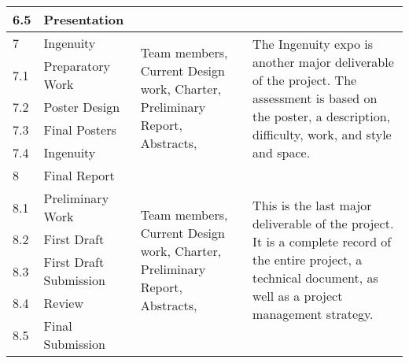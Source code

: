 \begin{longtable}[c]{|l|l|p{4cm}|p{10cm}|}
6.5 & Presentation &  &  \\ \hline
7 & Ingenuity & \multirow{5}{*}{\parbox{4cm}{Team members, Current Design work, Charter, Preliminary Report, Abstracts,}} & \multirow{5}{*}{\parbox{10cm}{The Ingenuity expo is another major deliverable of the project. The assessment is based on the poster, a description, difficulty, work, and style and space.}} \\ \cline{1-2}
7.1 & Preparatory Work &  &  \\ \cline{1-2}
7.2 & Poster Design &  &  \\ \cline{1-2}
7.3 & Final Posters &  &  \\ \cline{1-2}
7.4 & Ingenuity &  &  \\ \hline
8 & Final Report & \multirow{6}{*}{\parbox{4cm}{Team members, Current Design work, Charter, Preliminary Report, Abstracts,}} & \multirow{6}{*}{\parbox{10cm}{This is the last major deliverable of the project. It is a complete record of the entire project, a technical document, as well as a project management strategy.}} \\ \cline{1-2}
8.1 & Preliminary Work &  &  \\ \cline{1-2}
8.2 & First Draft &  &  \\ \cline{1-2}
8.3 & First Draft Submission &  &  \\ \cline{1-2}
8.4 & Review &  &  \\ \cline{1-2}
8.5 & Final Submission &  &  \\ \hline
\end{longtable}
